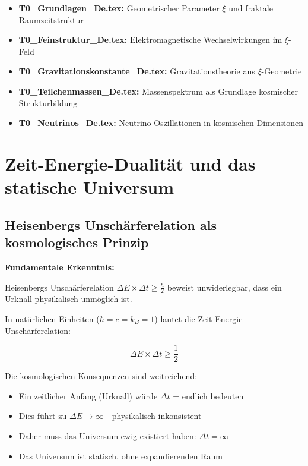 \documentclass[12pt,a4paper]{article}
\newcommand{\xipar}{\xi}
\begin{document}
	\begin{itemize}
		\item \textbf{T0\_Grundlagen\_De.tex:} Geometrischer Parameter $\xipar$ und fraktale Raumzeitstruktur
		\item \textbf{T0\_Feinstruktur\_De.tex:} Elektromagnetische Wechselwirkungen im $\xi$-Feld
		\item \textbf{T0\_Gravitationskonstante\_De.tex:} Gravitationstheorie aus $\xi$-Geometrie
		\item \textbf{T0\_Teilchenmassen\_De.tex:} Massenspektrum als Grundlage kosmischer Strukturbildung
		\item \textbf{T0\_Neutrinos\_De.tex:} Neutrino-Oszillationen in kosmischen Dimensionen
	\end{itemize}
	
	\section{Zeit-Energie-Dualität und das statische Universum}
	
	\subsection{Heisenbergs Unschärferelation als kosmologisches Prinzip}
	
	\begin{revolutionary}
		\textbf{Fundamentale Erkenntnis:}
		
		Heisenbergs Unschärferelation $\Delta E \times \Delta t \geq \frac{\hbar}{2}$ beweist unwiderlegbar, dass ein Urknall physikalisch unmöglich ist.
	\end{revolutionary}
	
	In natürlichen Einheiten ($\hbar = c = k_B = 1$) lautet die Zeit-Energie-Unschärferelation:
	
	\begin{equation}
		\Delta E \times \Delta t \geq \frac{1}{2}
	\end{equation}
	
	Die kosmologischen Konsequenzen sind weitreichend:
	
	\begin{itemize}
		\item Ein zeitlicher Anfang (Urknall) würde $\Delta t$ = endlich bedeuten
		\item Dies führt zu $\Delta E \to \infty$ - physikalisch inkonsistent
		\item Daher muss das Universum ewig existiert haben: $\Delta t = \infty$
		\item Das Universum ist statisch, ohne expandierenden Raum
	\end{itemize}
	
\end{document}
